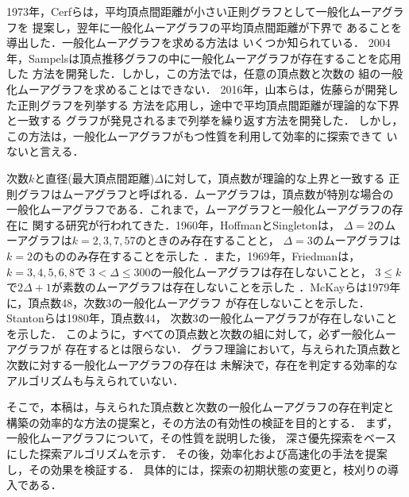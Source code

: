 1973年，Cerfらは，平均頂点間距離が小さい正則グラフとして一般化ムーアグラフを
提案し\cite{Cerf1973}，翌年に一般化ムーアグラフの平均頂点間距離が下界で
あることを導出した\cite{Cerf1974Lower}．一般化ムーアグラフを求める方法は
いくつか知られている．
2004年，Sampelsは頂点推移グラフの中に一般化ムーアグラフが存在することを応用した
方法を開発した\cite{Sampels2004}．しかし，この方法では，任意の頂点数と次数の
組の一般化ムーアグラフを求めることはできない．
2016年，山本らは，佐藤らが開発した正則グラフを列挙する
方法\cite{Sato2008}を応用し，途中で平均頂点間距離が理論的な下界と一致する
グラフが発見されるまで列挙を繰り返す方法を開発した\cite{Yamamoto2016}．
しかし，この方法は，一般化ムーアグラフがもつ性質を利用して効率的に探索できて
いないと言える．

次数$k$と直径(最大頂点間距離)$\Delta$に対して，頂点数が理論的な上界と一致する
正則グラフはムーアグラフと呼ばれる．ムーアグラフは，頂点数が特別な場合の
一般化ムーアグラフである．これまで，ムーアグラフと一般化ムーアグラフの存在に
関する研究が行われてきた\cite{Miller2005}．1960年，HoffmanとSingletonは，
$\Delta=2$のムーアグラフは$k=2,3,7,57$のときのみ存在することと，
$\Delta=3$のムーアグラフは$k=2$のもののみ存在することを示した
\cite{Hoffman1960}．また，1969年，Friedmanは，$k=3,4,5,6,8$で
$3<\Delta\leq300$の一般化ムーアグラフは存在しないことと，
$3\leq k$で$2\Delta+1$が素数のムーアグラフは存在しないことを示した
\cite{Friedman1971}．McKayらは1979年に，頂点数48，次数3の一般化ムーアグラフ
が存在しないことを\cite{McKay1979}示した．Stantonらは1980年，頂点数44，
次数3の一般化ムーアグラフが存在しないことを示した\cite{Stanton1980}．
このように，すべての頂点数と次数の組に対して，必ず一般化ムーアグラフが
存在するとは限らない．
グラフ理論において，与えられた頂点数と次数に対する一般化ムーアグラフの存在は
未解決で，存在を判定する効率的なアルゴリズムも与えられていない．

そこで，本稿は，与えられた頂点数と次数の一般化ムーアグラフの存在判定と
構築の効率的な方法の提案と，その方法の有効性の検証を目的とする．
まず，一般化ムーアグラフについて，その性質を説明した後，
深さ優先探索をベースにした探索アルゴリズムを示す．
その後，効率化および高速化の手法を提案し，その効果を検証する．
具体的には，探索の初期状態の変更と，枝刈りの導入である．
